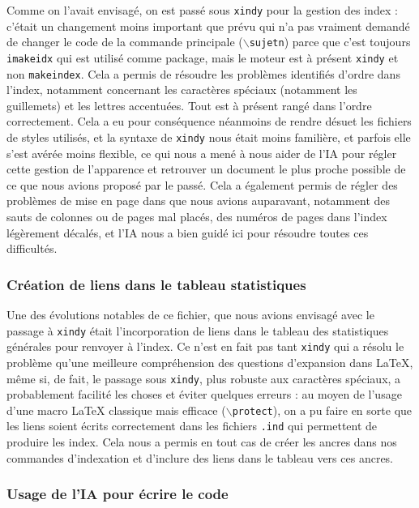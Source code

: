 Comme on l'avait envisagé, on est passé sous \texttt{xindy} pour la gestion des index : c'était un changement moins important que prévu qui n'a pas vraiment demandé de changer le code de la commande principale (\texttt{$\backslash$sujetn}) parce que c'est toujours \texttt{imakeidx} qui est utilisé comme package, mais le moteur est à présent \texttt{xindy} et non \texttt{makeindex}. Cela a permis de résoudre les problèmes identifiés d'ordre dans l'index, notamment concernant les caractères spéciaux (notamment les guillemets) et les lettres accentuées. Tout est à présent rangé dans l'ordre correctement. Cela a eu pour conséquence néanmoins de rendre désuet les fichiers de styles utilisés, et la syntaxe de \texttt{xindy} nous était moins familière, et parfois elle s'est avérée moins flexible, ce qui nous a mené à nous aider de l'IA pour régler cette gestion de l'apparence et retrouver un document le plus proche possible de ce que nous avions proposé par le passé. Cela a également permis de régler des problèmes de mise en page dans que nous avions auparavant, notamment des sauts de colonnes ou de pages mal placés, des numéros de pages dans l'index légèrement décalés, et l'IA nous a bien guidé ici pour résoudre toutes ces difficultés.

\subsubsection{Création de liens dans le tableau statistiques}

Une des évolutions notables de ce fichier, que nous avions envisagé avec le passage à \texttt{xindy} était l'incorporation de liens dans le tableau des statistiques générales pour renvoyer à l'index. Ce n'est en fait pas tant \texttt{xindy} qui a résolu le problème qu'une meilleure compréhension des questions d'expansion dans \LaTeX{}, même si, de fait, le passage sous \texttt{xindy}, plus robuste aux caractères spéciaux, a probablement facilité les choses et éviter quelques erreurs : au moyen de l'usage d'une macro \LaTeX{} classique mais efficace (\texttt{$\backslash$protect}), on a pu faire en sorte que les liens soient écrits correctement dans les fichiers \texttt{.ind} qui permettent de produire les index. Cela nous a permis en tout cas de créer les ancres dans nos commandes d'indexation et d'inclure des liens dans le tableau vers ces ancres.

\subsubsection{Usage de l'IA pour écrire le code}


